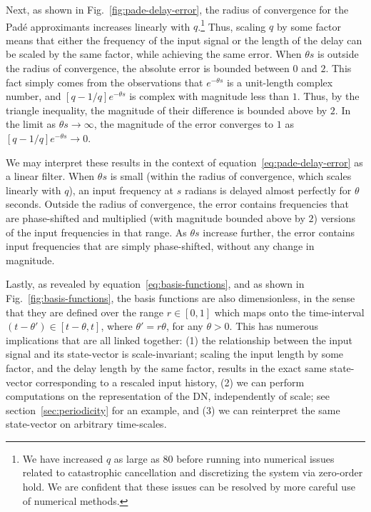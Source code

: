 Next, as shown in Fig.~\ref{fig:pade-delay-error}, the radius of convergence for the Pad\'e approximants increases linearly with $q$.\footnote{
We have increased $q$ as large as $80$ before running into numerical issues related to catastrophic cancellation and discretizing the system via zero-order hold.
We are confident that these issues can be resolved by more careful use of numerical methods.}
Thus, scaling $q$ by some factor means that either the frequency of the input signal or the length of the delay can be scaled by the same factor, while achieving the same error.
When $\theta s$ is outside the radius of convergence, the absolute error is bounded between $0$ and $2$.
This fact simply comes from the observations that $e^{-\theta s}$ is a unit-length complex number, and $[q-1/q]e^{-\theta s}$ is complex with magnitude less than $1$.
Thus, by the triangle inequality, the magnitude of their difference is bounded above by $2$.
In the limit as $\theta s \rightarrow \infty$, the magnitude of the error converges to $1$ as $[q-1/q]e^{-\theta s} \rightarrow 0$.

We may interpret these results in the context of equation~\ref{eq:pade-delay-error} as a linear filter.
When $\theta s$ is small (within the radius of convergence, which scales linearly with $q$), an input frequency at $s$ radians is delayed almost perfectly for $\theta$ seconds.
Outside the radius of convergence, the error contains frequencies that are phase-shifted and multiplied (with magnitude bounded above by $2$) versions of the input frequencies in that range.
As $\theta s$ increase further, the error contains input frequencies that are simply phase-shifted, without any change in magnitude.

Lastly, as revealed by equation~\ref{eq:basis-functions}, and as shown in Fig.~\ref{fig:basis-functions}, the basis functions are also dimensionless, in the sense that they are defined over the range $r \in [0, 1]$ which maps onto the time-interval $(t - \theta') \in [t - \theta, t]$, where $\theta' = r \theta$, for any $\theta > 0$.
This has numerous implications that are all linked together: (1) the relationship between the input signal and its state-vector is scale-invariant; scaling the input length by some factor, and the delay length by the same factor, results in the exact same state-vector corresponding to a rescaled input history, (2) we can perform computations on the representation of the DN, independently of scale; see section~\ref{sec:periodicity} for an example, and (3) we can reinterpret the same state-vector on arbitrary time-scales.


